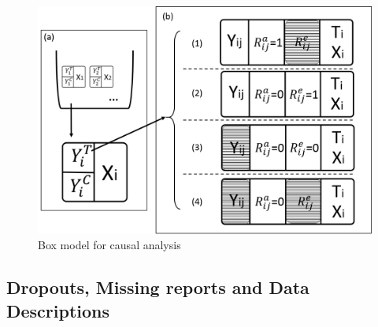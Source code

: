 \documentclass[preprint,12pt]{elsarticle}
\begin{document}
\begin{figure}[!htb]
\centering
\includegraphics[scale=0.4]{box_model.png}
\caption{Box model for causal analysis}
\label{fig:box_model}
\end{figure}

\subsection{Dropouts, Missing reports and Data Descriptions}
\end{document}
